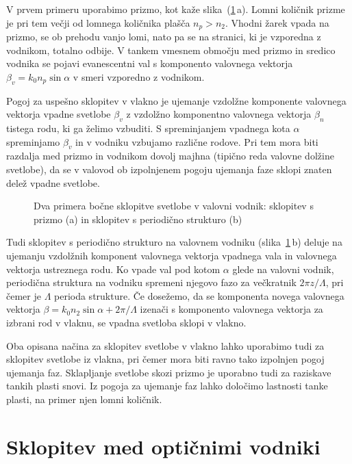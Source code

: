 V prvem primeru uporabimo prizmo, kot kaže slika~(\ref{fig:coupler}\,a). Lomni količnik prizme
je pri tem večji od lomnega količnika plašča $n_p > n_2$.
Vhodni žarek vpada na prizmo, se ob prehodu vanjo lomi, nato pa se na stranici, ki je vzporedna
z vodnikom, totalno odbije. 
V tankem vmesnem območju med prizmo in sredico vodnika se pojavi evanescentni
val s komponento valovnega vektorja $\beta_v  = k_0 n_p \sin \alpha$ v 
smeri vzporedno z vodnikom. 

Pogoj za uspešno 
sklopitev v vlakno je ujemanje vzdolžne komponente valovnega vektorja vpadne svetlobe $\beta_v$ 
z vzdolžno komponentno valovnega vektorja $\beta_n$ tistega rodu, ki ga želimo vzbuditi. 
S spreminjanjem vpadnega kota $\alpha$ spreminjamo $\beta_v$ in v vodniku vzbujamo različne rodove. 
Pri tem mora biti razdalja med prizmo in vodnikom dovolj majhna (tipično reda valovne dolžine svetlobe), 
da se v valovod ob izpolnjenem pogoju ujemanja faze sklopi znaten delež vpadne svetlobe.

\begin{figure}[h]
\centering
\def\svgwidth{140truemm} 
 
\caption{Dva primera bočne sklopitve svetlobe v valovni vodnik: sklopitev s prizmo (a) in sklopitev
s periodično strukturo (b)}
\label{fig:coupler}
\end{figure}
Tudi sklopitev s periodično strukturo na valovnem vodniku (slika~\ref{fig:coupler}\,b) deluje na 
ujemanju vzdolžnih komponent valovnega vektorja vpadnega vala in valovnega vektorja ustreznega rodu.
Ko vpade val pod kotom $\alpha$ glede na valovni vodnik, periodična struktura na vodniku 
spremeni njegovo fazo za večkratnik $2 \pi z/\Lambda$, pri čemer je $\Lambda$ perioda strukture.
Če dosežemo, da se komponenta novega valovnega vektorja $\beta = k_0 n_2 \sin \alpha+ 
2 \pi/\Lambda$ izenači s  komponento valovnega vektorja za izbrani rod v vlaknu, 
se vpadna svetloba sklopi v vlakno.

\begin{remark}
 Oba opisana načina za sklopitev svetlobe v vlakno lahko uporabimo tudi za sklopitev svetlobe 
 iz vlakna, pri čemer mora biti ravno tako izpolnjen pogoj ujemanja faz. 
 Sklapljanje svetlobe skozi prizmo je uporabno tudi za raziskave tankih plasti snovi. 
 Iz pogoja za ujemanje faz lahko določimo lastnosti tanke plasti, na primer njen lomni količnik. 
\end{remark}

\section{Sklopitev med optičnimi vodniki}

